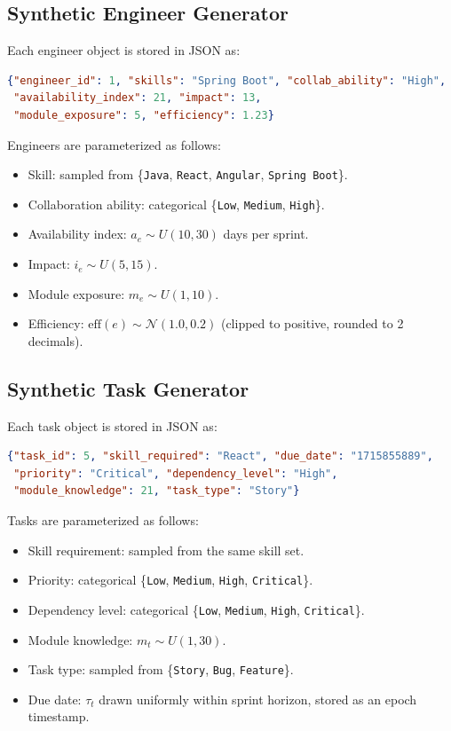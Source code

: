\documentclass[final,1p,times]{elsarticle}
\begin{document}
\subsection{Synthetic Engineer Generator}
Each engineer object is stored in JSON as:
\begin{lstlisting}[language=json]
{"engineer_id": 1, "skills": "Spring Boot", "collab_ability": "High",
 "availability_index": 21, "impact": 13,
 "module_exposure": 5, "efficiency": 1.23}
\end{lstlisting}

Engineers are parameterized as follows:
\begin{itemize}[leftmargin=*]
    \item Skill: sampled from \{\texttt{Java}, \texttt{React}, \texttt{Angular}, \texttt{Spring Boot}\}.
    \item Collaboration ability: categorical \{\texttt{Low}, \texttt{Medium}, \texttt{High}\}.
    \item Availability index: $a_e \sim U(10,30)$ days per sprint.
    \item Impact: $i_e \sim U(5,15)$.
    \item Module exposure: $m_e \sim U(1,10)$.
    \item Efficiency: $\mathrm{eff}(e) \sim \mathcal{N}(1.0,0.2)$ (clipped to positive, rounded to 2 decimals).
\end{itemize}

\subsection{Synthetic Task Generator}
Each task object is stored in JSON as:
\begin{lstlisting}[language=json]
{"task_id": 5, "skill_required": "React", "due_date": "1715855889",
 "priority": "Critical", "dependency_level": "High",
 "module_knowledge": 21, "task_type": "Story"}
\end{lstlisting}

Tasks are parameterized as follows:
\begin{itemize}[leftmargin=*]
    \item Skill requirement: sampled from the same skill set.
    \item Priority: categorical \{\texttt{Low}, \texttt{Medium}, \texttt{High}, \texttt{Critical}\}.
    \item Dependency level: categorical \{\texttt{Low}, \texttt{Medium}, \texttt{High}, \texttt{Critical}\}.
    \item Module knowledge: $m_t \sim U(1,30)$.
    \item Task type: sampled from \{\texttt{Story}, \texttt{Bug}, \texttt{Feature}\}.
    \item Due date: $\tau_t$ drawn uniformly within sprint horizon, stored as an epoch timestamp.
\end{itemize}
\end{document}
